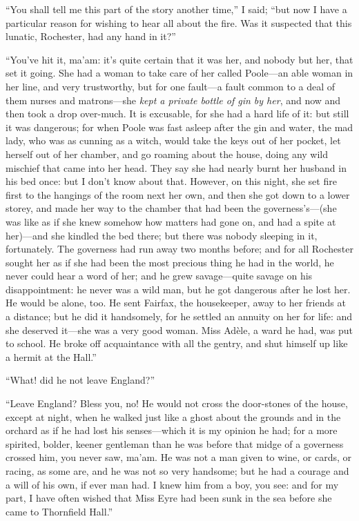 \enquote{You shall tell me this part of the story another time,} I said;
\enquote{but now I have a particular reason for wishing to hear all
about the fire. Was it suspected that this lunatic, \Mrs{} Rochester, had
any hand in it?}

\enquote{You've hit it, ma'am: it's quite certain that it was her, and nobody
but her, that set it going. She had a woman to take care of her called
\Mrs{} Poole---an able woman in her line, and very trustworthy, but for
one fault---a fault common to a deal of them nurses and matrons---she
\emph{kept a private bottle of gin by her}, and now and then took a drop
over-much. It is excusable, for she had a hard life of it: but still it
was dangerous; for when \Mrs{} Poole was fast asleep after the gin and
water, the mad lady, who was as cunning as a witch, would take the keys
out of her pocket, let herself out of her chamber, and go roaming about
the house, doing any wild mischief that came into her head. They say
she had nearly burnt her husband in his bed once: but I don't know about
that. However, on this night, she set fire first to the hangings of the
room next her own, and then she got down to a lower storey, and made her
way to the chamber that had been the governess's---(she was like as if
she knew somehow how matters had gone on, and had a spite at her)---and
she kindled the bed there; but there was nobody sleeping in it,
fortunately. The governess had run away two months before; and for all
\Mr{} Rochester sought her as if she had been the most precious thing he
had in the world, he never could hear a word of her; and he grew
savage---quite savage on his disappointment: he never was a wild man,
but he got dangerous after he lost her. He would be alone, too. He
sent \Mrs{} Fairfax, the housekeeper, away to her friends at a distance;
but he did it handsomely, for he settled an annuity on her for life: and
she deserved it---she was a very good woman. Miss Adèle, a ward he had,
was put to school. He broke off acquaintance with all the gentry, and
shut himself up like a hermit at the Hall.}

\enquote{What! did he not leave England?}

\enquote{Leave England? Bless you, no! He would not cross the
door-stones of the house, except at night, when he walked just like a
ghost about the grounds and in the orchard as if he had lost his
senses---which it is my opinion he had; for a more spirited, bolder,
keener gentleman than he was before that midge of a governess crossed
him, you never saw, ma'am. He was not a man given to wine, or cards, or
racing, as some are, and he was not so very handsome; but he had a
courage and a will of his own, if ever man had. I knew him from a boy,
you see: and for my part, I have often wished that Miss Eyre had been
sunk in the sea before she came to Thornfield Hall.}

